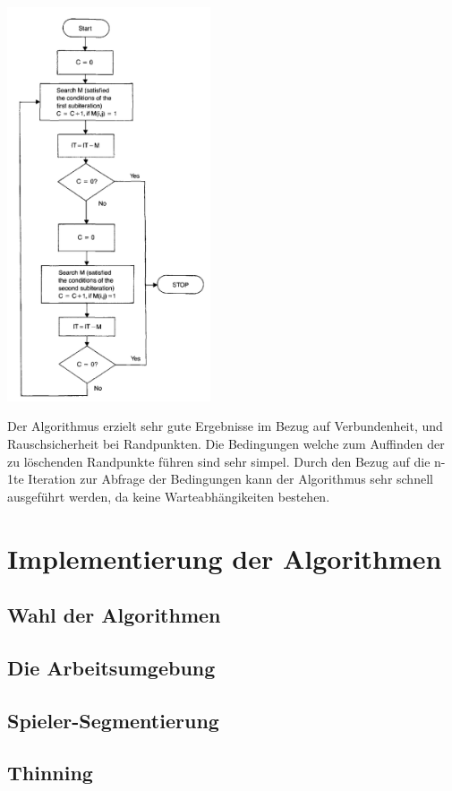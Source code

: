 \documentclass[
	12pt,
	a4paper,
	BCOR10mm,
	DIV14,
	listof=totoc,
	bibliography=totoc,
	headsepline
]{scrreprt}
\begin{document}
\includegraphics[width=6cm]{Res/AlgUebersicht.png}


Der Algorithmus erzielt sehr gute Ergebnisse im Bezug auf Verbundenheit, und Rauschsicherheit bei Randpunkten. Die Bedingungen welche zum Auffinden der zu löschenden Randpunkte führen sind sehr simpel. Durch den Bezug auf die n-1te Iteration zur Abfrage der Bedingungen kann der Algorithmus sehr schnell ausgeführt werden, da keine Warteabhängikeiten bestehen.

\chapter{Implementierung der Algorithmen}
\section{Wahl der Algorithmen}
\section{Die Arbeitsumgebung}
\section{Spieler-Segmentierung}
\section{Thinning}
\end{document}
